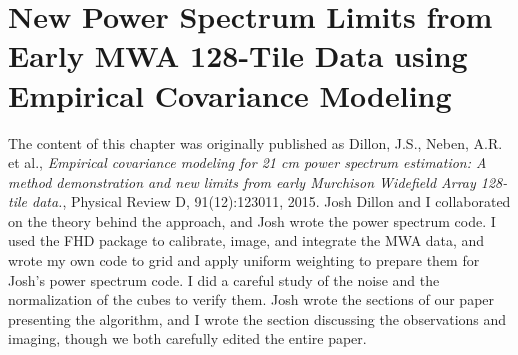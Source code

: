 \newcommand{\modelResidualCorr}{0.116}
\newcommand{\limitDeltaSq}{3.7\times 10^4}
\newcommand{\limitk}{0.18}
\newcommand{\limitz}{6.8}
\newcommand{\wedgeBuffer}{0.02}

\newcommand{\BigO}[1]{\mathcal{O}(#1)}
\newcommand{\F}{\mathbf{F}}
\newcommand{\M}{\mathbf{M}}
\newcommand{\CC}{\mathbf{C}}
\newcommand{\beq}{\begin{equation}}
\newcommand{\eeq}{\end{equation}}
\newcommand{\Sig}{\mathbf{S}}
\newcommand{\Eye}{\mathbf{I}}
\newcommand{\x}{\mathbf{x}}
\newcommand{\kvec}{\mathbf{k}}
\newcommand{\N}{\mathbf{N}}
\newcommand{\n}{\mathbf{n}}
\newcommand{\m}{\mathbf{m}}
\newcommand{\mean}{\boldsymbol\mu}
\newcommand{\base}{\mathbf{b}}
\newcommand{\thvec}{\bm{\theta}}
\newcommand{\A}{\mathbf{A}}
\newcommand{\p}{\mathbf{p}}
\newcommand{\q}{\mathbf{q}}
\newcommand{\Proj}{\mathbf{\Pi}}
\newcommand{\PSF}{\mathbf{P}} 
\newcommand{\K}{\mathbf{K}}
\newcommand{\y}{\mathbf{y}}
\newcommand{\J}{\mathbf{J}}
\newcommand{\D}{\mathbf{D}}
\newcommand{\T}{\mathbf{T}}
\newcommand{\W}{\mathbf{W}}
\newcommand{\Q}{\mathbf{Q}}
\newcommand{\E}{\mathbf{E}}
\newcommand{\trans}{\mathsf{T}}
\newcommand{\rhat}{\hat{\mathbf{r}}}
\newcommand{\xhat}{\widehat{\x}}
\newcommand{\CHat}{\widehat{\CC}}

\chapter{New Power Spectrum Limits from Early MWA 128-Tile Data using Empirical Covariance Modeling}
\label{chap:newlimits}
The content of this chapter was originally published as Dillon, J.S., Neben, A.R. et al., \textit{Empirical covariance modeling for 21 cm power spectrum estimation: A method demonstration and new limits from early Murchison Widefield Array 128-tile data.}, Physical Review D, 91(12):123011, 2015. Josh Dillon and I collaborated on the theory behind the approach, and Josh wrote the power spectrum code. I used the FHD package to calibrate, image, and integrate the MWA data, and wrote my own code to grid and apply uniform weighting to prepare them for Josh's power spectrum code. I did a careful study of the noise and the normalization of the cubes to verify them. Josh wrote the sections of our paper presenting the algorithm, and I wrote the section discussing the observations and imaging, though we both carefully edited the entire paper. \\

